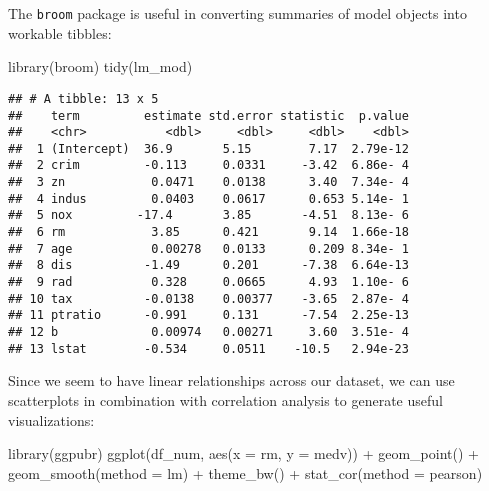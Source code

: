 \documentclass[
]{book}
\newenvironment{Shaded}{\begin{snugshade}}{\end{snugshade}}
\newcommand{\AttributeTok}[1]{\textcolor[rgb]{0.77,0.63,0.00}{#1}}
\newcommand{\FunctionTok}[1]{\textcolor[rgb]{0.00,0.00,0.00}{#1}}
\newcommand{\NormalTok}[1]{#1}
\newcommand{\SpecialCharTok}[1]{\textcolor[rgb]{0.00,0.00,0.00}{#1}}
\newcommand{\StringTok}[1]{\textcolor[rgb]{0.31,0.60,0.02}{#1}}
\begin{document}
The \texttt{broom} package is useful in converting summaries of model objects into workable tibbles:

\begin{Shaded}
\begin{Highlighting}[]
\FunctionTok{library}\NormalTok{(broom)}
\FunctionTok{tidy}\NormalTok{(lm\_mod)}
\end{Highlighting}
\end{Shaded}

\begin{verbatim}
## # A tibble: 13 x 5
##    term         estimate std.error statistic  p.value
##    <chr>           <dbl>     <dbl>     <dbl>    <dbl>
##  1 (Intercept)  36.9       5.15        7.17  2.79e-12
##  2 crim         -0.113     0.0331     -3.42  6.86e- 4
##  3 zn            0.0471    0.0138      3.40  7.34e- 4
##  4 indus         0.0403    0.0617      0.653 5.14e- 1
##  5 nox         -17.4       3.85       -4.51  8.13e- 6
##  6 rm            3.85      0.421       9.14  1.66e-18
##  7 age           0.00278   0.0133      0.209 8.34e- 1
##  8 dis          -1.49      0.201      -7.38  6.64e-13
##  9 rad           0.328     0.0665      4.93  1.10e- 6
## 10 tax          -0.0138    0.00377    -3.65  2.87e- 4
## 11 ptratio      -0.991     0.131      -7.54  2.25e-13
## 12 b             0.00974   0.00271     3.60  3.51e- 4
## 13 lstat        -0.534     0.0511    -10.5   2.94e-23
\end{verbatim}

Since we seem to have linear relationships across our dataset, we can use scatterplots in combination with correlation analysis to generate useful visualizations:

\begin{Shaded}
\begin{Highlighting}[]
\FunctionTok{library}\NormalTok{(ggpubr)}
\FunctionTok{ggplot}\NormalTok{(df\_num, }\FunctionTok{aes}\NormalTok{(}\AttributeTok{x =}\NormalTok{ rm, }\AttributeTok{y =}\NormalTok{ medv)) }\SpecialCharTok{+} 
  \FunctionTok{geom\_point}\NormalTok{() }\SpecialCharTok{+} 
  \FunctionTok{geom\_smooth}\NormalTok{(}\AttributeTok{method =} \StringTok{\textquotesingle{}lm\textquotesingle{}}\NormalTok{) }\SpecialCharTok{+} \FunctionTok{theme\_bw}\NormalTok{() }\SpecialCharTok{+} 
  \FunctionTok{stat\_cor}\NormalTok{(}\AttributeTok{method =} \StringTok{\textquotesingle{}pearson\textquotesingle{}}\NormalTok{)}
\end{Highlighting}
\end{Shaded}
\end{document}
